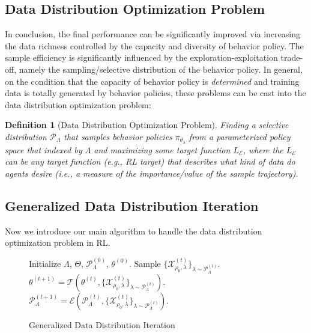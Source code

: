 \documentclass[nohyperref]{article}
\theoremstyle{plain}
\newtheorem{definition}{Definition}[section]
\begin{document}
\subsection{Data Distribution Optimization Problem}
\label{sec: Data Distribution Optimization Problem}

In conclusion, the final performance can be significantly improved via increasing the data richness controlled by  the capacity and diversity of behavior policy. The sample efficiency is significantly influenced by the exploration-exploitation trade-off, namely the sampling/selective distribution  of the behavior policy. In general, on the condition that the capacity of behavior policy is \emph{determined} and training data is totally generated by behavior policies, these problems can be cast into  the data distribution optimization problem:

\begin{definition}[Data Distribution Optimization Problem] \label{Data Distribution Optimization Problem} Finding a selective distribution $\mathcal{P}_{\Lambda}$ that samples behavior policies $\pi_{\theta_\lambda}$ from a parameterized policy space that indexed by $\Lambda$ and maximizing some target function $L_{\mathcal{E}}$, where the $L_{\mathcal{E}}$ can be any target function (e.g., RL target) that describes what kind of data do agents desire (i.e., a measure of the importance/value of the sample trajectory).
\end{definition}

 \subsection{Generalized Data Distribution Iteration}
 \label{sec: Generalized Data Distribution Iteration}
 Now we introduce our main algorithm to handle the data distribution optimization problem in RL.

\begin{figure}[ht]
  \centering
  \begin{minipage}{\linewidth}
    \begin{algorithm}[H]
      \caption{Generalized Data Distribution Iteration}  
          \begin{algorithmic}
            \STATE Initialize $\Lambda$, $\Theta$, $\mathcal{P}_{\Lambda}^{(0)}$, $\theta^{(0)}$.
                \STATE Sample $\{\mathcal{X}^{(t)}_{\rho_0, \lambda}\}_{\lambda \sim \mathcal{P}^{(t)}_{\Lambda}}$. 
                \STATE $\theta^{(t+1)} = \mathcal{T}( \theta^{(t)}, \{\mathcal{X}^{(t)}_{\rho_0, \lambda}\}_{\lambda \sim \mathcal{P}^{(t)}_{\Lambda}} )$.  
                \STATE $\mathcal{P}_{\Lambda}^{(t+1)}  = \mathcal{E}(\mathcal{P}_{\Lambda}^{(t)}, \{\mathcal{X}^{(t)}_{\rho_0, \lambda}\}_{\lambda \sim \mathcal{P}^{(t)}_{\Lambda}} )$. 
            \ENDFOR
          \end{algorithmic}
        \label{alg:GDI}
    \end{algorithm}
  \end{minipage}
\end{figure}
\end{document}
